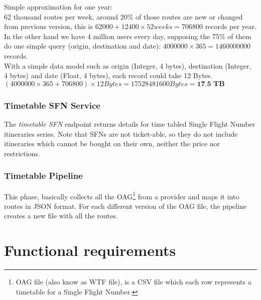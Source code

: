 Simple approximation for one year:
\\
62 thousand routes per week, around 20\% of those routes are new or changed from previous version, this is $62000+12400\times52weeks=706800$ records per year.
\\
In the other hand we have 4 million users every day, supposing the 75\% of them do one simple query (origin, destination and date): $4000000\times365=1460000000$ records.
\\
With a simple data model such as origin (Integer, 4 bytes), destination (Integer, 4 bytes) and date (Float, 4 bytes), each record could take 12 Bytes.
\\
$(4000000\times365+706800)\times12 Bytes = 17528481600 Bytes = \textbf{17.5 TB}$


\subsubsection*{Timetable SFN Service} \label{timetable_sfn_service}

The \textit{timetable SFN} endpoint returns details for time tabled Single Flight Number itineraries series. Note that SFNs are not ticket-able, so they do not include itineraries which cannot be bought on their own, neither the price nor restrictions.

\subsubsection*{Timetable Pipeline} \label{timetable_pipeline}

This phase, basically collects all the OAG\footnote{OAG file (also know as WTF file), is a CSV\cite{csv} file which each row represents a timetable for a Single Flight Number.} from a provider and maps it into routes in JSON\cite{json} format. For each different version of the OAG file, the pipeline creates a new file with all the routes.


\section{Functional requirements}

